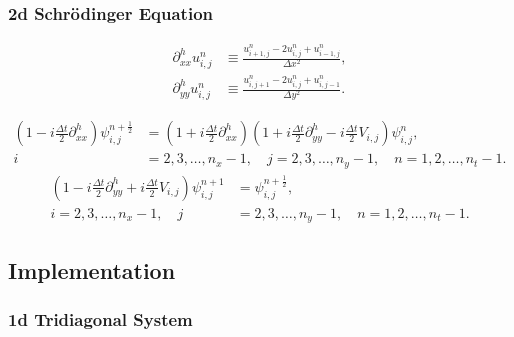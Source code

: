 \documentclass[10pt]{article}
\begin{document}


\subsubsection*{2d Schrödinger Equation}

\begin{align*}
    \partial_{xx}^h u_{i,j}^n &\equiv \frac{u_{i+1,j}^n - 2u_{i,j}^n + u_{i-1,j}^n}{\Delta x^2}, \\[10pt]
    \partial_{yy}^h u_{i,j}^n &\equiv \frac{u_{i,j+1}^n - 2u_{i,j}^n + u_{i,j-1}^n}{\Delta y^2}.
\end{align*}


\begin{align}\label{ADI_1}
\left( 1 - i \frac{\Delta t}{2} \partial_{xx}^h \right) \psi_{i,j}^{n+\frac{1}{2}} &=
\left( 1 + i \frac{\Delta t}{2} \partial_{xx}^h \right)
\left( 1 + i \frac{\Delta t}{2} \partial_{yy}^h - i \frac{\Delta t}{2} V_{i,j} \right) \psi_{i,j}^n,
\nonumber \\ i &= 2,3,\ldots,n_x-1, \quad j = 2,3,\ldots,n_y-1, \quad n = 1,2,\ldots,n_t-1.
\end{align}
\begin{align}\label{ADI_2}
\left( 1 - i \frac{\Delta t}{2} \partial_{yy}^h + i \frac{\Delta t}{2} V_{i,j} \right) 
\psi_{i,j}^{n+1} &= \psi_{i,j}^{n+\frac{1}{2}},
\nonumber \\ i = 2,3,\ldots,n_x-1, \quad j &= 2,3,\ldots,n_y-1, \quad n = 1,2,\ldots,n_t-1.
\end{align}




\subsection*{Implementation}

\subsubsection*{1d Tridiagonal System}

\end{document}
